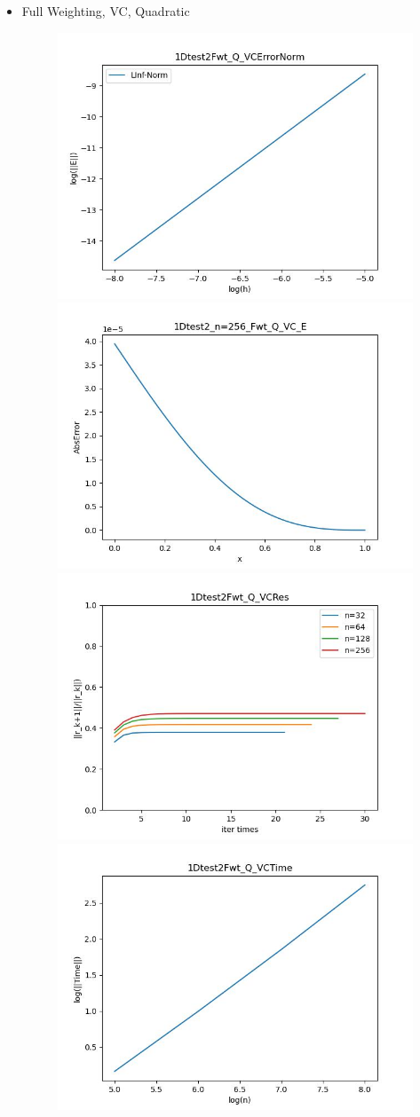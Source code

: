 \documentclass{article}
\begin{document}
\begin{itemize}
    \item Full Weighting, VC, Quadratic
    \begin{figure}[h]
        \centering
        \includegraphics[width=0.35\linewidth]{1Dtest2Fwt_Q_VCErrorNorm.jpg}
        \includegraphics[width=0.35\linewidth]{1Dtest2_n=256_Fwt_Q_VC_E.jpg}
        \includegraphics[width=0.35\linewidth]{1Dtest2Fwt_Q_VCRes.jpg}
        \includegraphics[width=0.35\linewidth]{1Dtest2Fwt_Q_VCTime.jpg}
    \end{figure}
    

\end{itemize}
\end{document}
